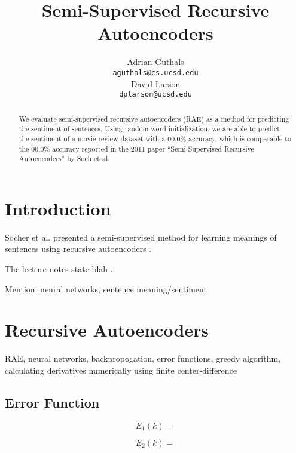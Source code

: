 \documentclass{article}
\title{Semi-Supervised Recursive Autoencoders}
\author{
Adrian Guthals \\
\texttt{aguthals@cs.ucsd.edu} \\
\And
David Larson \\
\texttt{dplarson@ucsd.edu} \\
}
\begin{document}
\maketitle


\begin{abstract}
We evaluate semi-supervised recursive autoencoders (RAE) as a method for predicting the sentiment of sentences. Using random word initialization, we are able to predict the sentiment of a movie review dataset with a 00.0\% accuracy, which is comparable to the 00.0\% accuracy reported in the 2011 paper ``Semi-Supervised Recursive Autoencoders'' by Soch et al.
\end{abstract}



\section{Introduction}

Socher et al. presented a semi-supervised method for learning meanings of sentences using recursive autoencoders \cite{Socher}.

The lecture notes state blah \cite{CSE250B}.

Mention: neural networks, sentence meaning/sentiment



\section{Recursive Autoencoders}

RAE, neural networks, backpropogation, error functions, greedy algorithm, calculating derivatives numerically using finite center-difference


\subsection{Error Function}
\begin{equation}
    E_1 (k) =
\end{equation}

\begin{equation}
    E_2 (k) =
\end{equation}
\end{document}
